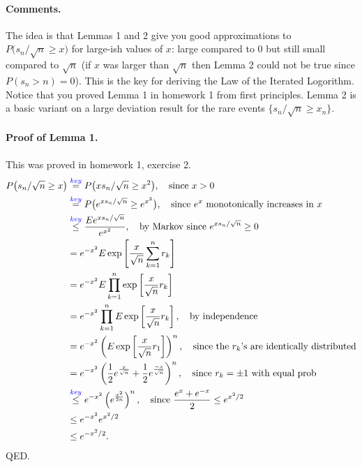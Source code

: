 \documentclass[11pt,letterpaper]{article}
\begin{document}
\paragraph{Comments.} 
The idea is that Lemmas 1 and 2 give you good approximations to   $P\bigl(s_n/\sqrt{n} \geq x\bigr)$ for large-ish values of $x$: large compared to $0$ but still small compared to $\sqrt{n}$ (if $x$ was larger than $\sqrt{n}$ then Lemma 2 could not be true since $P(s_n> n)=0$). This is the key for deriving the Law of the Iterated Logorithm. Notice that you proved Lemma 1 in homework 1 from first principles. %
Lemma 2 is a basic variant on a large deviation result for  the rare events  $\{  s_n/\sqrt{n} \geq x_n\}$. 


\newpage
\paragraph{Proof of Lemma 1.}
This was proved in homework 1, exercise 2.
\begin{align*}
 P\bigl(s_n/\sqrt{n} \geq x\bigr) &\overset{\textcolor{blue}{key}}=  P\bigl(x s_n/\sqrt{n} \geq x^2\bigr),\quad\text{since $x>0$} \\
 &\overset{\textcolor{blue}{key}}= P\bigl(e^{x s_n/\sqrt{n} } \geq e^{x^2}\bigr),\quad\text{since $e^x$ monotonically increases in $x$} \\
 &\overset{\textcolor{blue}{key}}\leq \frac{Ee^{x s_n/\sqrt{n}}}{e^{x^2}},\quad\text{by Markov since $e^{x s_n/\sqrt{n}}\geq 0$}\\
 &=e^{-x^2}E\exp\left[\frac{x}{\sqrt{n}} \sum_{k=1}^n {r_k} \right]\\
  &=e^{-x^2}E\prod_{k=1}^n\exp\left[\frac{x}{\sqrt{n}}  {r_k} \right]\\
    &=e^{-x^2}\prod_{k=1}^nE\exp\left[\frac{x}{\sqrt{n}}  {r_k} \right],\quad\text{by independence}\\
 &=e^{-x^2}\left(E\exp\left[\frac{x}{\sqrt{n}}  {r_1} \right]\right)^n,\quad\text{since the $r_k$'s are identically distributed}\\
 &=e^{-x^2}\left( \frac{1}{2}e^\frac{x}{\sqrt{n}} + \frac{1}{2}e^\frac{-x}{\sqrt{n}}\right)^n,\quad\text{since $r_k=\pm 1$ with equal prob}\\
 &\overset{\textcolor{blue}{key}}\leq e^{-x^2}\left(e^\frac{x^2}{2n}  \right)^n,\quad\text{since $\frac{e^x + e^{-x}}{2} \leq e^{x^2/2}$}\\
  &\leq e^{-x^2}e^{{x^2}/{2}} \\
   &\leq e^{-{x^2}/{2}}.
\end{align*}
QED.
\end{document}
